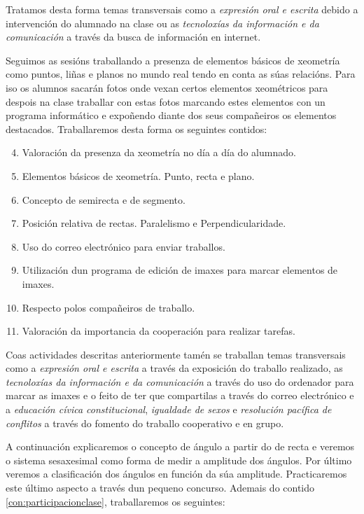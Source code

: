 Tratamos desta forma temas transversais como a \emph{expresión oral e escrita} debido a intervención do alumnado na clase ou as \emph{tecnoloxías da información e da comunicación} a través da busca de información en internet.

Seguimos as sesións traballando a presenza de elementos básicos de xeometría como puntos, liñas e planos no mundo real tendo en conta as súas relacións. Para iso os alumnos sacarán fotos onde vexan certos elementos xeométricos para despois na clase traballar con estas fotos marcando estes elementos con un programa informático e expoñendo diante dos seus compañeiros os elementos destacados. Traballaremos desta forma os seguintes contidos:

\begin{enumerate}[label=\bfseries Con\arabic*, align=left, leftmargin=1.5cm]
    \setcounter{enumi}{3}
    \item\label{con:xeometriacontorna} Valoración da presenza da xeometría no día a día do alumnado.
    \item\label{con:elementosbasicos} Elementos básicos de xeometría. Punto, recta e plano.
    \item\label{con:semirecta} Concepto de semirecta e de segmento.
    \item\label{con:posicionrectas} Posición relativa de rectas. Paralelismo e Perpendicularidade.
    \item\label{con:email} Uso do correo electrónico para enviar traballos.
    \item\label{con:gimp} Utilización dun programa de edición de imaxes para marcar elementos de imaxes.
    \item\label{con:companheiros} Respecto polos compañeiros de traballo.
    \item\label{con:cooperacion} Valoración da importancia da cooperación para realizar tarefas.
\end{enumerate}

Coas actividades descritas anteriormente tamén se traballan temas transversais como a \emph{expresión oral e escrita} a través da exposición do traballo realizado, as \emph{tecnoloxías da información e da comunicación} a través do uso do ordenador para marcar as imaxes e o feito de ter que compartilas a través do correo electrónico e a \emph{educación cívica constitucional}, \emph{igualdade de sexos} e \emph{resolución pacífica de conflitos} a través do fomento do traballo cooperativo e en grupo.

A continuación explicaremos o concepto de ángulo a partir do de recta e veremos o sistema sesaxesimal como forma de medir a amplitude dos ángulos. Por último veremos a clasificación dos ángulos en función da súa amplitude. Practicaremos este último aspecto a través dun pequeno concurso. Ademais do contido \ref{con:participacionclase}, traballaremos os seguintes:

